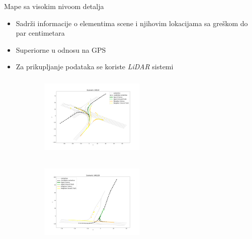 \documentclass[bookmarks=true,bookmarksopen=true,pdfborder={0 0 0},pdfhighlight={/N},linkbordercolor={.5 .5 .5},implicit=false,unicode,xcolor={table}]{beamer}
\begin{document}
\begin{frame}{Mape sa visokim nivoom detalja}

  \begin{itemize}
    \item Sadrži informacije o elementima scene i njihovim lokacijama sa greškom do par centimetara
    \item Superiorne u odnosu na GPS
    \item Za prikupljanje podataka se koriste \textit{LiDAR} sistemi
  \end{itemize}

  \begin{figure}
		\begin{subfigure}{5cm}
			\includegraphics[width=5cm,height=4cm]{scenario_MIA_16518.png}
		\end{subfigure}
    \begin{subfigure}{5cm}
			\includegraphics[width=5cm,height=4cm]{scenario_MIA_148229.png}
		\end{subfigure}
	\end{figure}

\end{frame}
\end{document}
